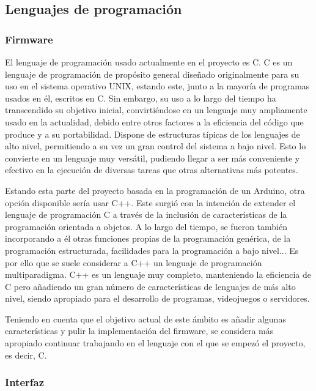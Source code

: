 \subsection{Lenguajes de programación}

\subsubsection{Firmware}

El lenguaje de programación usado actualmente en el proyecto es C. C es un lenguaje de programación de propósito general diseñado originalmente para su uso en el sistema operativo UNIX, estando este, junto a la mayoría de programas usados en él, escritos en C. Sin embargo, su uso a lo largo del tiempo ha transcendido su objetivo inicial, convirtiéndose en un lenguaje muy ampliamente usado en la actualidad, debido entre otros factores a la eficiencia del código que produce y a su portabilidad. Dispone de estructuras típicas de los lenguajes de alto nivel, permitiendo a su vez un gran control del sistema a bajo nivel. Esto lo convierte en un lenguaje muy versátil, pudiendo llegar a ser más conveniente y efectivo en la ejecución de diversas tareas que otras alternativas más potentes. \cite{k&r}

Estando esta parte del proyecto basada en la programación de un Arduino, otra opción disponible sería usar C++. Este surgió con la intención de extender el lenguaje de programación C a través de la inclusión de características de la programación orientada a objetos. A lo largo del tiempo, se fueron también incorporando a él otras funciones propias de la programación genérica, de la programación estructurada, facilidades para la programación a bajo nivel... Es por ello que se suele considerar a C++ un lenguaje de programación multiparadigma. C++ es un lenguaje muy completo, manteniendo la eficiencia de C pero añadiendo un gran número de características de lenguajes de más alto nivel, siendo apropiado para el desarrollo de programas, videojuegos o servidores.

Teniendo en cuenta que el objetivo actual de este ámbito es añadir algunas características y pulir la implementación del firmware, se considera más apropiado continuar trabajando en el lenguaje con el que se empezó el proyecto, es decir, C. 

\subsubsection{Interfaz}

